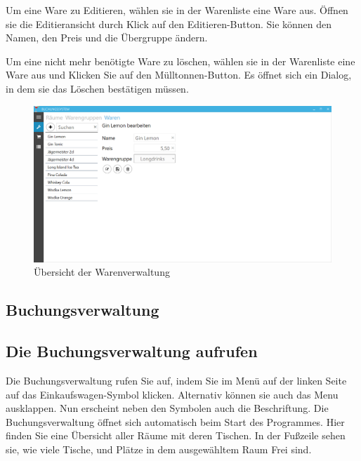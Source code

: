 Um eine Ware zu Editieren, wählen sie in der Warenliste eine Ware aus. Öffnen sie die Editieransicht durch Klick auf den Editieren-Button. 
Sie können den Namen, den Preis und die Übergruppe ändern.

Um eine nicht mehr benötigte Ware zu löschen, wählen sie in der Warenliste eine Ware aus und Klicken Sie auf den Mülltonnen-Button. Es öffnet sich ein Dialog, in dem sie das Löschen bestätigen müssen.

\begin{figure}[h]
	\begin{center}
		\includegraphics[width=\columnwidth]{Benutzerhandbuch/Warenverwaltung.png}
	\end{center}
	\caption{Übersicht der Warenverwaltung}
	\label{fig:product-management}
\end{figure}

\subsection{Buchungsverwaltung}

\subsection{Die Buchungsverwaltung aufrufen}

Die Buchungsverwaltung rufen Sie auf, indem Sie im Menü auf der linken Seite auf das Einkaufswagen-Symbol klicken. Alternativ können sie auch das Menu ausklappen. Nun erscheint neben den Symbolen auch die Beschriftung.
Die Buchungsverwaltung öffnet sich automatisch beim Start des Programmes. 
Hier finden Sie eine Übersicht aller Räume mit deren Tischen. In der Fußzeile sehen sie, wie viele Tische, und Plätze in dem ausgewähltem Raum Frei sind.

